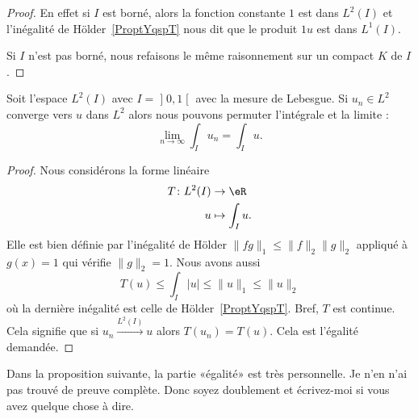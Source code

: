 \begin{proof}
    En effet si \( I\) est borné, alors la fonction constante \( 1\) est dans \( L^2(I)\) et l'inégalité de Hölder~\ref{ProptYqspT} nous dit que le produit \( 1u\) est dans \( L^1(I)\).

    Si \( I\) n'est pas borné, nous refaisons le même raisonnement sur un compact \( K\) de \( I\).
\end{proof}

\begin{corollary}        \label{CORooIIEAooNmbkTo}
    Soit l'espace \( L^2(I)\) avec \( I=\mathopen] 0 , 1 \mathclose[\) avec la mesure de Lebesgue. Si \( u_n\in L^2\) converge vers \( u\) dans \( L^2\) alors nous pouvons permuter l'intégrale et la limite :
        \begin{equation}
            \lim_{n\to \infty} \int_Iu_n=\int_Iu.
        \end{equation}
\end{corollary}

\begin{proof}
    Nous considérons la forme linéaire
    \begin{equation}
        \begin{aligned}
            T\colon L^2(I)&\to \eR \\
            u&\mapsto \int_Iu .
        \end{aligned}
    \end{equation}
    Elle est bien définie par l'inégalité de Hölder \( \| fg \|_1\leq \| f \|_2\| g \|_2\) appliqué à \( g(x)=1\) qui vérifie \( \| g \|_2=1\). Nous avons aussi
    \begin{equation}
        T(u)\leq \int_I| u |\leq \| u \|_1\leq\| u \|_2
    \end{equation}
    où la dernière inégalité est celle de Hölder~\ref{ProptYqspT}. Bref, \( T\) est continue. Cela signifie que si \( u_n\stackrel{L^2(I)}{\longrightarrow}u\) alors \( T(u_n)=T(u)\). Cela est l'égalité demandée.
\end{proof} 

\begin{probleme}
    Dans la proposition suivante, la partie «égalité» est très personnelle. Je n'en n'ai pas trouvé de preuve complète. Donc soyez doublement  et écrivez-moi si vous avez quelque chose à dire.
\end{probleme}

